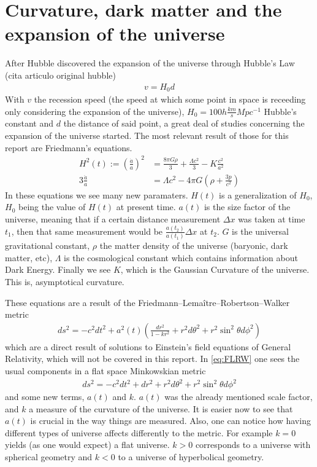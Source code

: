 \section{Curvature, dark matter and the expansion of the universe}
After Hubble discovered the expansion of the universe through Hubble's Law (cita articulo original hubble)
\begin{align}
	v = H_0 d
	\label{eq:ley-hubble}
\end{align}
With $v$ the recession speed (the speed at which some point in space is receeding only considering the expansion of the universe), $H_0=100h \frac{km}{s}Mpc ^{-1}$ Hubble's constant and $d$ the distance of said point, a great deal of studies concerning the expansion of the universe started. The most relevant result of those for this report are Friedmann's equations.
\begin{align}
	H^2(t) := \left(\frac{\dot a}{a}\right)^2 &=  \frac{8\pi G \rho}{3} +\frac{\Lambda c^2}{3} - K \frac{c^2}{a^2}
	\label{eq:1a-friedmann}\\
	3 \frac{\ddot a}{a} &= \Lambda c^2 - 4\pi G \left( \rho + \frac{3p}{c^2} \right) 
	\label{eq:2a-friedmann}
\end{align}
In these equations we see many new paramaters. $H(t)$ is a generalization of $H_0$, $H_0$ being the value of $H(t)$ at present time. $a(t)$ is the size factor of the universe, meaning that if a certain distance measurement $\Delta x$ was taken at time $t_1$, then that same measurement would be $\frac{a(t_2)}{a(t_1)}\Delta x$ at $t_2$. $G$ is the universal gravitational constant, $\rho$ the matter density of the universe (baryonic, dark matter, etc), $\Lambda$ is the cosmological constant which contains information about Dark Energy. Finally we see $K$, which is the Gaussian Curvature of the universe. This is, asymptotical curvature.

These equations are a result of the Friedmann–Lemaître–Robertson–Walker metric 
\begin{align}
	ds ^2 = -c^2 dt^2  + a^2(t) \left( \frac{dr^2}{1-kr^2} +r^2d\theta ^2 + r^2 \sin^2\theta d\phi^2\right) 
	\label{eq:FLRW}
\end{align}which are a direct result of solutions to Einstein's field equations of General Relativity, which will not be covered in this report. In \eqref{eq:FLRW} one sees the usual components in a flat space Minkowskian metric 
\begin{align}
	ds^2 = -c^2dt^2 + dr^2 + r^2d\theta^2 + r^2 \sin^2\theta d\phi^2
\end{align} and some new terms, $a(t)$ and $k$. $a(t)$ was the already mentioned scale factor, and $k$ a measure of the curvature of the universe. It is easier now to see that $a(t)$ is crucial in the way things are measured. Also, one can notice how having different types of universe affects differently to the metric. For example $k=0$ yields (as one would expect) a flat universe. $k>0$ corresponds to a universe with spherical geometry and $k<0$ to a universe of hyperbolical geometry.

